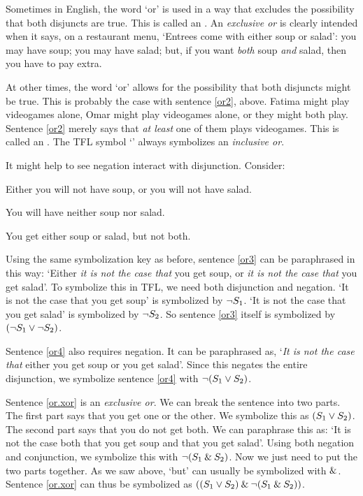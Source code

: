 Sometimes in English, the word `or' is used in a way that excludes the possibility that both disjuncts are true. This is called an .  An \emph{exclusive or} is clearly intended when it says, on a restaurant menu, `Entrees come with either soup or salad': you may have soup; you may have salad; but, if you want \emph{both} soup \emph{and} salad, then you have to pay extra.

At other times, the word `or' allows for the possibility that both disjuncts might be true. This is probably the case with sentence \ref{or2}, above. Fatima might play videogames alone, Omar might play videogames alone, or they might both play. Sentence \ref{or2} merely says that \emph{at least} one of them plays videogames. This is called an . The TFL symbol `\eor' always symbolizes an \emph{inclusive or}.

It might help to see negation interact with disjunction. Consider:
	\begin{earg}
		\item[\ex{or3}] Either you will not have soup, or you will not have salad.
		\item[\ex{or4}] You will have neither soup nor salad.
		\item[\ex{or.xor}] You get either soup or salad, but not both.
	\end{earg}
Using the same symbolization key as before, sentence \ref{or3} can be paraphrased in this way: `Either \emph{it is not the case that} you get soup, or \emph{it is not the case that} you get salad'. To symbolize this in TFL, we need both disjunction and negation. `It is not the case that you get soup' is symbolized by $\neg S_1$. `It is not the case that you get salad' is symbolized by $\neg S_2$. So sentence \ref{or3} itself is symbolized by $(\neg S_1 \vee \neg S_2)$.

Sentence \ref{or4} also requires negation. It can be paraphrased as, `\emph{It is not the case that} either you get soup or you get salad'. Since this negates the entire disjunction, we symbolize sentence \ref{or4} with $\neg (S_1 \vee S_2)$.

Sentence \ref{or.xor} is an \emph{exclusive or}. We can break the sentence into two parts. The first part says that you get one or the other. We symbolize this as $(S_1 \vee S_2)$. The second part says that you do not get both. We can paraphrase this as: `It is not the case both that you get soup and that you get salad'. Using both negation and conjunction, we symbolize this with $\neg(S_1 \mathbin{\&} S_2)$. Now we just need to put the two parts together. As we saw above, `but' can usually be symbolized with $\mathbin{\&}$. Sentence \ref{or.xor} can thus be symbolized as $((S_1 \vee S_2) \mathbin{\&} \neg(S_1 \mathbin{\&} S_2))$.

